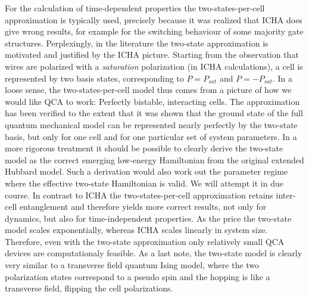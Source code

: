 For the calculation of time-dependent properties the two-states-per-cell
approximation is typically used, precisely because it was realized that ICHA
does give wrong results, for example for the switching behaviour of some
majority gate structures. Perplexingly, in the literature the two-state
approximation is motivated and justified by the ICHA picture.  Starting from the
observation that wires are polarized with a \emph{saturation} polarization (in
ICHA calculations), a cell is represented by two basis states, corresponding to
$P = P_{sat}$ and $P = - P_{sat}$. In a loose sense, the two-states-per-cell
model thus comes from a picture of how we would like QCA to work: Perfectly
bistable, interacting cells. The approximation has been verified to the extent
that it was shown that the ground state of the full quantum mechanical model can
be represented nearly perfectly by the two-state basis, but only for one cell
and for one particular set of system parameters. In a more rigorous treatment it
should be possible to clearly derive the two-state model as the correct emerging
low-energy Hamiltonian from the original extended Hubbard model. Such a
derivation would also work out the parameter regime where the effective
two-state Hamiltonian is valid. We will attempt it in due course. In contrast to
ICHA the two-states-per-cell approximation retains inter-cell entanglement and
therefore yields more correct results, not only for dynamics, but also for
time-independent properties. As the price the two-state model scales
exponentially, whereas ICHA scales linearly in system size.  Therefore, even
with the two-state approximation only relatively small QCA devices are
computationaly feasible. As a last note, the two-state model is clearly very
similar to a transverse field quantum Ising model, where the two polarization
states correspond to a pseudo spin and the hopping is like a transverse field,
flipping the cell polarizations.


















